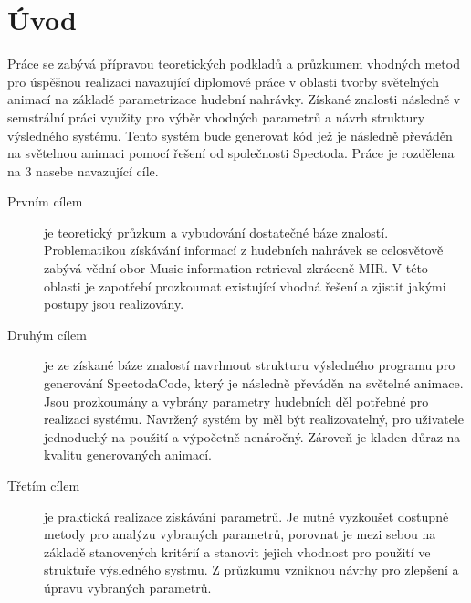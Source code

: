 \chapter*{Úvod}
{}

Práce se zabývá přípravou teoretických podkladů a průzkumem vhodných metod pro úspěšnou realizaci navazující diplomové práce v oblasti tvorby světelných animací na základě parametrizace hudební nahrávky. Získané znalosti následně v semstrální práci využity pro výběr vhodných parametrů a návrh struktury výsledného systému. Tento systém bude generovat kód jež je následně převáděn na světelnou animaci pomocí řešení od společnosti Spectoda. Práce je rozdělena na 3 nasebe navazující cíle.
\begin{description}
    \item[Prvním cílem] je teoretický průzkum a vybudování dostatečné báze znalostí. Problematikou získávání informací z hudebních nahrávek se celosvětově zabývá vědní obor Music information retrieval zkráceně \acs{MIR}. V této oblasti je zapotřebí prozkoumat existující vhodná řešení a zjistit jakými postupy jsou realizovány. 
    \item[Druhým cílem] je ze získané báze znalostí navrhnout strukturu výsledného programu pro generování SpectodaCode, který je následně převáděn na světelné animace. Jsou prozkoumány a vybrány parametry hudebních děl potřebné pro realizaci systému. Navržený systém by měl být realizovatelný, pro uživatele jednoduchý na použití a výpočetně nenáročný. Zároveň je kladen důraz na kvalitu generovaných animací.
    \item[Třetím cílem] je praktická realizace získávání parametrů. Je nutné vyzkoušet dostupné metody pro analýzu vybraných parametrů, porovnat je mezi sebou na základě stanovených kritérií a stanovit jejich vhodnost pro použití ve struktuře výsledného systmu. Z průzkumu vzniknou návrhy pro zlepšení a úpravu vybraných parametrů. 
\end{description}




